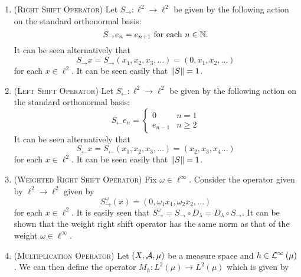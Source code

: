\begin{enumerate}
    \item (\textsc{Right Shift Operator}) Let $S_{\rightarrow} : \ell ^{2} \to \ell ^{2}$ be given by the following action on the standard orthonormal basis:
	\begin{equation*}
	    S_{\rightarrow} e_{n} = e_{n+1} \text{ for each } n\in \mathbb N.
	\end{equation*}
	It can be seen alternatively that 
	\begin{equation*}
	    S_{\rightarrow}x =S_{\rightarrow} \left( x_{1} , x_{2}, x_{3} , \ldots \right) = \left( 0, x_{1}, x_{2}, \ldots \right)
	\end{equation*}
	for each $x\in \ell ^{2}$. It can be seen easily that $\left\lVert S \right\rVert = 1$.
    \item   (\textsc{Left Shift Operator}) Let $S_{\leftarrow}: \ell ^{2} \to \ell ^{2}$ be given by the following action on the standard orthonormal basis:
	\begin{equation*}
	    S_{\leftarrow} e_{n} = 
	    \begin{cases}
		0 & n=1 \\
		e_{n-1} & n\ge 2
	    \end{cases}
	\end{equation*}
	It can be seen alternatively that 
	\begin{equation*}
	    S_{\leftarrow}x =S_{\leftarrow} \left( x_{1} , x_{2}, x_{3} , \ldots \right) = \left(x_{2}, x_{3}, x_{4} \ldots \right)
	\end{equation*}
	for each $x\in \ell ^{2}$. It can be seen easily that $\left\lVert S \right\rVert = 1$.
    \item (\textsc{Weighted Right Shift Operator}) Fix $\omega \in \ell ^{\infty}$. Consider the operator given by $\ell ^{2} \to \ell ^{2}$ given by 
	\begin{equation*}
	    S_{\rightarrow} ^{\omega} \left( x \right) = \left( 0, \omega_{1} x_{1}, \omega_{2} x_{2} , \ldots \right)
    \end{equation*}
    for each $x\in \ell ^{2}$.
    It is easily seen that $S_{\rightarrow} ^{\omega} = S_{\rightarrow} \circ D_{\lambda} =D_{\lambda} \circ S_{\rightarrow}$. It can be shown that the weight right shift operator has the same norm as that of the weight $\omega \in \ell ^{\infty}$.
\item (\textsc{Multiplication Operator}) Let $\left( X, {\cal A}, \mu \right)$ be a measure space and $h\in {\cal L} ^{\infty} \left( \mu \right)$. We can then define the operator $M_{h} : L^{2} \left( \mu \right) \to L^{2} \left( \mu \right)$ which is given by

\end{enumerate}
